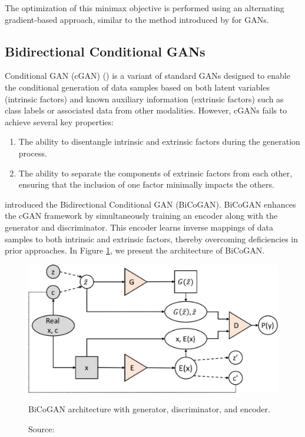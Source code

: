 The optimization of this minimax objective is performed
using an alternating gradient-based approach, similar to the method
introduced by \cite{goodfellow2014} for GANs.

\subsection{Bidirectional Conditional GANs}

Conditional GAN (cGAN) (\cite{mirza2014})
is a variant of standard GANs designed to enable the
conditional generation of data samples based on both latent variables
(intrinsic factors) and known auxiliary information (extrinsic factors)
such as class labels or associated data from other modalities.
However, cGANs fails to achieve several key properties:

\begin{enumerate}
    \item The ability to disentangle intrinsic and extrinsic
    factors during the generation process.
    \item The ability to separate the components of extrinsic
    factors from each other, ensuring that the inclusion of one
    factor minimally impacts the others.
\end{enumerate}

\cite{jaiswal2018} introduced the Bidirectional Conditional GAN (BiCoGAN).
BiCoGAN enhances the cGAN framework by simultaneously training an encoder
along with the generator and discriminator.
This encoder learns inverse mappings of data samples to both intrinsic
and extrinsic factors, thereby overcoming deficiencies in prior approaches.
In Figure \ref{fig:bicogan}, we present the architecture of BiCoGAN.

\begin{figure}[h]
    \centering
    \includegraphics[width=.8\textwidth]{figures/ch3/7.bicogan.jpeg}
    \caption{BiCoGAN architecture with generator, discriminator, and encoder.}
    \vspace{-10px}
    \caption*{\scriptsize{Source: \cite{jaiswal2018}}}
    \label{fig:bicogan}
\end{figure}

